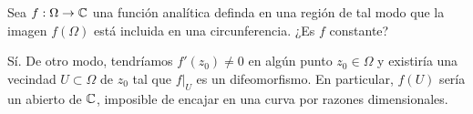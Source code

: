 \begin{exercise}
Sea $f : \Omega \to \mathbb C$ una función analítica definda en una región de tal modo que la imagen $f(\Omega)$ está incluida en una circunferencia. ¿Es $f$ constante? 
\end{exercise}

\begin{solution}
Sí. De otro modo, tendríamos $f'(z_0) \ne 0$ en algún punto $z_0 \in \Omega$ y existiría una vecindad $U \subset \Omega$ de $z_0$ tal que $f|_U$ es un difeomorfismo. En particular, $f(U)$ sería un abierto de $\mathbb C$, imposible de encajar en una curva por razones dimensionales.
\end{solution}
